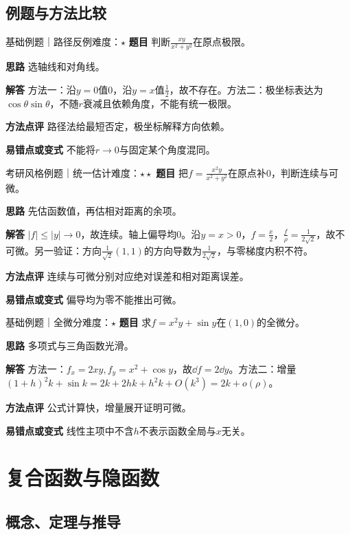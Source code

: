 \subsection{例题与方法比较}
\begin{example}{基础例题｜路径反例}{难度：$\star$}
\label{ex:6:1}\textbf{题目} 判断$\frac{xy}{x^2+y^2}$在原点极限。\par
\textbf{思路} 选轴线和对角线。\par
\textbf{解答} 方法一：沿$y=0$值0，沿$y=x$值$\frac{1}{2}$，故不存在。方法二：极坐标表达为$\cos\theta\sin\theta$，不随$r$衰减且依赖角度，不能有统一极限。\par
\textbf{方法点评} 路径法给最短否定，极坐标解释方向依赖。\par
\textbf{易错点或变式} 不能将$r\to0$与固定某个角度混同。
\end{example}
\begin{example}{考研风格例题｜统一估计}{难度：$\star\star$}
\label{ex:6:2}\textbf{题目} 把$f=\frac{x^2y}{x^2+y^2}$在原点补0，判断连续与可微。\par
\textbf{思路} 先估函数值，再估相对距离的余项。\par
\textbf{解答} $|f|\le|y|\to0$，故连续。轴上偏导均0。沿$y=x>0$，$f=\frac{x}{2}$，$\frac{f}{\rho}=\frac{1}{2\sqrt2}$，故不可微。另一验证：方向$\frac{1}{\sqrt2}(1,1)$的方向导数为$\frac{1}{2\sqrt2}$，与零梯度内积不符。\par
\textbf{方法点评} 连续与可微分别对应绝对误差和相对距离误差。\par
\textbf{易错点或变式} 偏导均为零不能推出可微。
\end{example}
\begin{example}{基础例题｜全微分}{难度：$\star$}
\label{ex:6:3}\textbf{题目} 求$f=x^2y+\sin y$在$(1,0)$的全微分。\par
\textbf{思路} 多项式与三角函数光滑。\par
\textbf{解答} 方法一：$f_x=2xy,f_y=x^2+\cos y$，故$\dd f=2\dd y$。方法二：增量$(1+h)^2k+\sin k=2k+2hk+h^2k+O(k^3)=2k+o(\rho)$。\par
\textbf{方法点评} 公式计算快，增量展开证明可微。\par
\textbf{易错点或变式} 线性主项中不含$h$不表示函数全局与$x$无关。
\end{example}
\section{复合函数与隐函数}\label{sec:6:2}
\subsection{概念、定理与推导}

